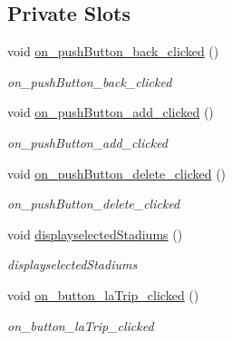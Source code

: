 \subsection*{Private Slots}
\begin{DoxyCompactItemize}
\item 
\mbox{\label{class_tour_a33ba0751eeef5ffeb09875a3f085c5a7}} 
void \hyperlink{class_tour_a33ba0751eeef5ffeb09875a3f085c5a7}{on\+\_\+push\+Button\+\_\+back\+\_\+clicked} ()
\begin{DoxyCompactList}\small\item\em on\+\_\+push\+Button\+\_\+back\+\_\+clicked \end{DoxyCompactList}\item 
\mbox{\label{class_tour_a3e211e214d112b0144c059f06bbd8206}} 
void \hyperlink{class_tour_a3e211e214d112b0144c059f06bbd8206}{on\+\_\+push\+Button\+\_\+add\+\_\+clicked} ()
\begin{DoxyCompactList}\small\item\em on\+\_\+push\+Button\+\_\+add\+\_\+clicked \end{DoxyCompactList}\item 
\mbox{\label{class_tour_ae38c23a5f9aee44e2308a49d71c2a467}} 
void \hyperlink{class_tour_ae38c23a5f9aee44e2308a49d71c2a467}{on\+\_\+push\+Button\+\_\+delete\+\_\+clicked} ()
\begin{DoxyCompactList}\small\item\em on\+\_\+push\+Button\+\_\+delete\+\_\+clicked \end{DoxyCompactList}\item 
\mbox{\label{class_tour_ade1a9ac70d72cb40c38a629f0be1781d}} 
void \hyperlink{class_tour_ade1a9ac70d72cb40c38a629f0be1781d}{displayselected\+Stadiums} ()
\begin{DoxyCompactList}\small\item\em displayselected\+Stadiums \end{DoxyCompactList}\item 
\mbox{\label{class_tour_a2192d4564cc3644f070caa8519121c12}} 
void \hyperlink{class_tour_a2192d4564cc3644f070caa8519121c12}{on\+\_\+button\+\_\+la\+Trip\+\_\+clicked} ()
\begin{DoxyCompactList}\small\item\em on\+\_\+button\+\_\+la\+Trip\+\_\+clicked \end{DoxyCompactList}\item 

\end{DoxyCompactItemize}

